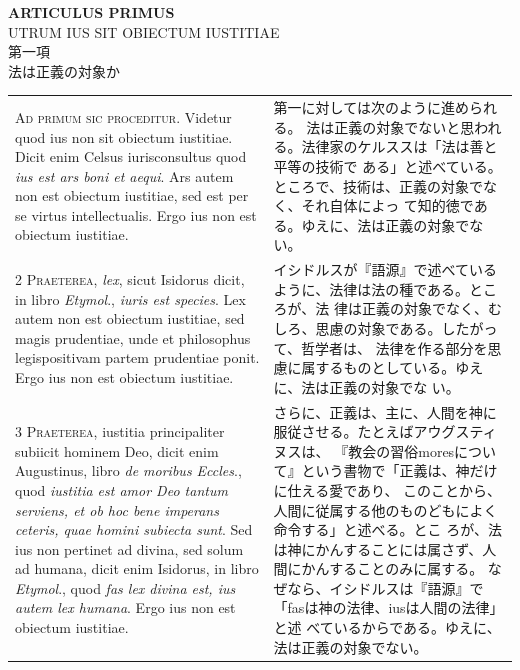 \documentclass[paper=a4paper,fontsize=10pt,jafontsize=9pt,titlepage]{jlreq}
\begin{document}
\begin{center}
{\Large {\bfseries ARTICULUS PRIMUS}}\\
{\large UTRUM IUS SIT OBIECTUM IUSTITIAE}\\
{\Large 第一項\\法は正義の対象か}
\end{center}

\begin{longtable}{p{21em}p{21em}}

{\huge A}{\scshape d primum sic proceditur}. 
Videtur quod ius non sit obiectum iustitiae. Dicit enim Celsus
 iurisconsultus quod {\itshape ius est ars boni et aequi}. Ars autem non est
 obiectum iustitiae, sed est per se virtus intellectualis. Ergo ius non
 est obiectum iustitiae.

&

第一に対しては次のように進められる。
法は正義の対象でないと思われる。法律家のケルススは「法は善と平等の技術で
 ある」と述べている。ところで、技術は、正義の対象でなく、それ自体によっ
 て知的徳である。ゆえに、法は正義の対象でない。


\\


{\scshape 2 Praeterea}, {\itshape lex}, sicut Isidorus dicit, in libro
 {\itshape Etymol}., {\itshape iuris est species}. Lex autem non est
 obiectum iustitiae, sed magis prudentiae, unde et philosophus
 legispositivam partem prudentiae ponit. Ergo ius non est obiectum
 iustitiae.


&

イシドルスが『語源』で述べているように、法律は法の種である。ところが、法
 律は正義の対象でなく、むしろ、思慮の対象である。したがって、哲学者は、
 法律を作る部分を思慮に属するものとしている。ゆえに、法は正義の対象でな
 い。

\\



{\scshape 3 Praeterea}, iustitia principaliter subiicit hominem Deo,
 dicit enim Augustinus, libro {\itshape de moribus Eccles}., quod
 {\itshape iustitia est amor Deo tantum serviens, et ob hoc bene
 imperans ceteris, quae homini subiecta sunt}. Sed ius non pertinet ad
 divina, sed solum ad humana, dicit enim Isidorus, in libro {\itshape
 Etymol}., quod {\itshape fas lex divina est, ius autem lex
 humana}. Ergo ius non est obiectum iustitiae.

&

さらに、正義は、主に、人間を神に服従させる。たとえばアウグスティヌスは、
 『教会の習俗moresについて』という書物で「正義は、神だけに仕える愛であり、
 このことから、人間に従属する他のものどもによく命令する」と述べる。とこ
 ろが、法は神にかんすることには属さず、人間にかんすることのみに属する。
 なぜなら、イシドルスは『語源』で「fasは神の法律、iusは人間の法律」と述
 べているからである。ゆえに、法は正義の対象でない。


\end{longtable}
\end{document}
